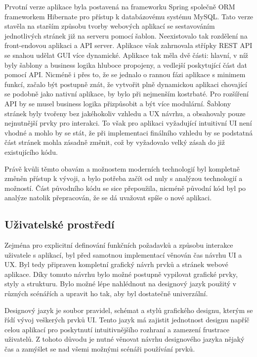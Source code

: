 	Prvotní verze aplikace byla postavená na frameworku Spring společně \ac{ORM} frameworkem Hibernate pro
	přístup k databázovému systému MySQL.
	Tato verze stavěla na starším způsobu tvorby webových aplikací se sestavováním jednotlivých stránek již na serveru pomocí
	šablon.
	Neexistovalo tak rozdělení na front-endovou aplikaci a \ac{API} server.
	Aplikace však zahrnovala střípky \ac{REST} \ac{API} se snahou udělat \ac{GUI} více dynamické.
	Aplikace tak měla dvě části: hlavní, v níž byly šablony a business logika hluboce propojeny, a vedlejší
	poskytující část dat pomocí \ac{API}.
	Nicméně i přes to, že se jednalo o rannou fázi aplikace s minimem funkcí, začalo být postupně znát, že vytvořit
	plně dynamickou aplikaci chovající se podobně jako nativní aplikace, by bylo při nejmenším kostrbaté.
	Pro rozšíření \ac{API} by se musel business logika přizpůsobit a být více modulární.
	Šablony stránek byly tvořeny bez jakéhokoliv vzhledu a \ac{UX} návrhu, a obsahovaly pouze nejnutnější prvky pro
	interakci.
	To však pro aplikaci vyžadující intuitivní \ac{UI} není vhodné a mohlo by se stát, že při implementaci finálního vzhledu
	by se podstatná část stránek mohla zásadně změnit, což by vyžadovalo velký zásah do již
	existujícího kódu.

	Právě kvůli těmto obavám a možnostem moderních technologií byl kompletně změněn přístup k vývoji, a bylo potřeba začít
	od nuly s analýzou technologií a možností.
	Část původního kódu se sice přepoužila, nicméně původní kód byl po analýze natolik přepracován, že se dá uvažovat
	spíše o nové aplikaci.

	\subsection{Uživatelské prostředí}

 	Zejména pro explicitní definování funkčních požadavků a způsobu interakce uživatele s aplikací, byl před samotnou
	implementací věnován čas návrhu \ac{UI} a \ac{UX}.
	Byl tedy připraven kompletní grafický návrh prvků a stránek webové aplikace.
	Díky tomuto návrhu bylo možné postupně vypilovat grafické prvky, styly a strukturu.
	Bylo možné lépe nahlédnout na designový jazyk použitý v různých scénářích a upravit ho tak, aby byl
	dostatečně univerzální.

	Designový jazyk je soubor pravidel, schémat a stylů grafického designu, kterým se řídí vývoj veškerých prvků \ac{UI}.
	Tento jazyk má zajistit jednotnost designu napříč celou aplikací pro poskytnutí intuitivnějšího rozhraní a zamezení
	frustrace uživatelů.
	Z tohoto důvodu je nutné věnovat návrhu designového jazyka nějaký čas a zamýšlet se nad všemi možnými scénáři používání
	prvků.

